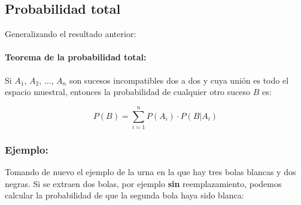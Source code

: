 \subsection{Probabilidad total}
Generalizando el resultado anterior:

\paragraph{Teorema de la probabilidad total:} Si $A_1$, $A_2$, ..., $A_n$   son sucesos incompatibles dos a dos y cuya unión es todo el espacio muestral, entonces la probabilidad de cualquier otro suceso $B$ es:

$$P(B)=\sum_{i=1}^n P(A_i)\cdot  P(B|A_i) $$

\subsubsection{Ejemplo:} Tomando de nuevo el ejemplo de la urna en la que hay tres bolas blancas y dos negras. Si se extraen dos bolas, por ejemplo \textbf{sin} reemplazamiento, podemos calcular la probabilidad de que la segunda bola haya sido blanca: 


